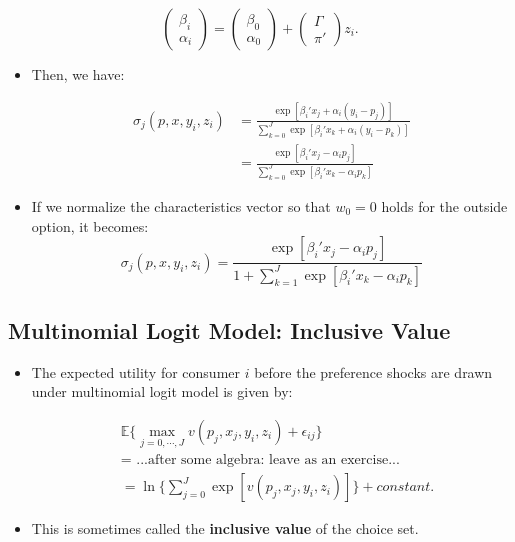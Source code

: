 \documentclass[]{book}
\providecommand{\tightlist}{%
  \setlength{\itemsep}{0pt}\setlength{\parskip}{0pt}}
\begin{document}
\begin{equation}
\begin{pmatrix}
\beta_i \\
\alpha_i
\end{pmatrix}
= 
\begin{pmatrix}
\beta_0 \\
\alpha_0
\end{pmatrix}
+
\begin{pmatrix}
\Gamma\\
\pi'
\end{pmatrix}
 z_i.
\end{equation}

\begin{itemize}
\tightlist
\item
  Then, we have:

  \begin{equation}
  \begin{split}
  \sigma_{j}(p, x, y_i, z_i) &= \frac{\exp[\beta_i'x_j + \alpha_i (y_i - p_j) ]}{\sum_{k = 0}^J \exp[\beta_i'x_k + \alpha_i (y_i - p_k) ]}\\
  &= \frac{\exp[\beta_i'x_j - \alpha_i p_j]}{\sum_{k = 0}^J \exp[\beta_i'x_k - \alpha_i p_k]}
  \end{split}
  \end{equation}
\item
  If we normalize the characteristics vector so that \(w_0 = 0\) holds
  for the outside option, it becomes: \[
  \sigma_{j}(p, x, y_i, z_i) = \frac{\exp[\beta_i'x_j - \alpha_i p_j]}{1 + \sum_{k = 1}^J \exp[\beta_i'x_k - \alpha_i p_k]}
  \]
\end{itemize}

\subsection{Multinomial Logit Model: Inclusive
Value}\label{multinomial-logit-model-inclusive-value}

\begin{itemize}
\tightlist
\item
  The expected utility for consumer \(i\) before the preference shocks
  are drawn under multinomial logit model is given by:

  \begin{equation}
  \begin{split}
  &\mathbb{E}\{\max_{j = 0, \cdots, J} v(p_j, x_j, y_i, z_i) + \epsilon_{ij}\} \\
  &= \text{   ...after some algebra: leave as an exercise...}\\
  &= \ln \Bigg\{\sum_{j = 0}^J \exp[v(p_j, x_j, y_i, z_i)] \Bigg\} + constant.
  \end{split} 
  \end{equation}
\item
  This is sometimes called the \textbf{inclusive value} of the choice
  set.
\end{itemize}
\end{document}
